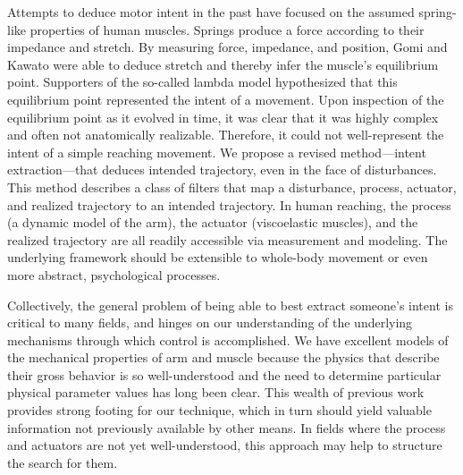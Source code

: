 \documentclass[10pt]{article}
\begin{document}
Attempts to deduce motor intent in the past have focused on the assumed spring-like properties of human muscles. Springs produce a force according to their impedance and stretch. By measuring force, impedance, and position, Gomi and Kawato\cite{gomi1997human} were able to deduce stretch and thereby infer the muscle’s equilibrium point. Supporters of the so-called lambda model\cite{feldman1995origin} hypothesized that this equilibrium point represented the intent of a movement. Upon inspection of the equilibrium point as it evolved in time, it was clear that it was highly complex and often not anatomically realizable. Therefore, it could not well-represent the intent of a simple reaching movement. We propose a revised method---intent extraction---that deduces intended trajectory, even in the face of disturbances. This method describes a class of filters that map a disturbance, process, actuator, and realized trajectory to an intended trajectory. In human reaching, the process (a dynamic model of the arm), the actuator (viscoelastic muscles), and the realized trajectory are all readily accessible via measurement and modeling. The underlying framework should be extensible to whole-body movement or even more abstract, psychological processes.

Collectively, the general problem of being able to best extract someone’s intent is critical to many fields, and hinges on our understanding of the underlying mechanisms through which control is accomplished. We have excellent models of the mechanical properties of arm and muscle because the physics that describe their gross behavior is so well-understood and the need to determine particular physical parameter values has long been clear. This wealth of previous work provides strong footing for our technique, which in turn should yield valuable information not previously available by other means. In fields where the process and actuators are not yet well-understood, this approach may help to structure the search for them.
\end{document}
